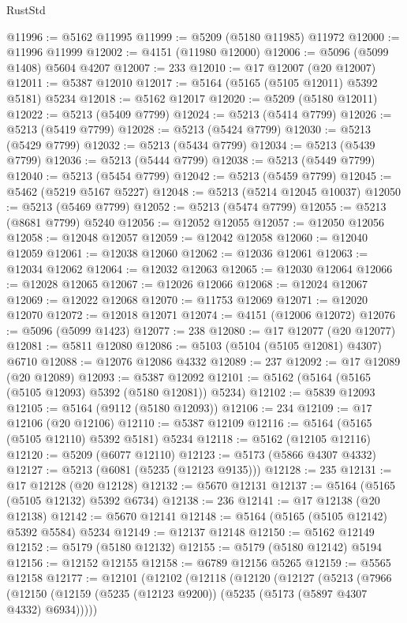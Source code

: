 \begin{lexlean}{RustStd}
\begin{coremodule}
@11996 := @5162 @11995
@11999 := @5209 (@5180 @11985) @11972
@12000 := @11996 @11999
@12002 := @4151 (@11980 @12000)
@12006 := @5096 (@5099 @1408) @5604 @4207
@12007 := 233
@12010 := @17 @12007 (@20 @12007)
@12011 := @5387 @12010
@12017 := @5164 (@5165 (@5105 @12011) @5392 @5181) @5234
@12018 := @5162 @12017
@12020 := @5209 (@5180 @12011)
@12022 := @5213 (@5409 @7799)
@12024 := @5213 (@5414 @7799)
@12026 := @5213 (@5419 @7799)
@12028 := @5213 (@5424 @7799)
@12030 := @5213 (@5429 @7799)
@12032 := @5213 (@5434 @7799)
@12034 := @5213 (@5439 @7799)
@12036 := @5213 (@5444 @7799)
@12038 := @5213 (@5449 @7799)
@12040 := @5213 (@5454 @7799)
@12042 := @5213 (@5459 @7799)
@12045 := @5462 (@5219 @5167 @5227)
@12048 := @5213 (@5214 @12045 @10037)
@12050 := @5213 (@5469 @7799)
@12052 := @5213 (@5474 @7799)
@12055 := @5213 (@8681 @7799) @5240
@12056 := @12052 @12055
@12057 := @12050 @12056
@12058 := @12048 @12057
@12059 := @12042 @12058
@12060 := @12040 @12059
@12061 := @12038 @12060
@12062 := @12036 @12061
@12063 := @12034 @12062
@12064 := @12032 @12063
@12065 := @12030 @12064
@12066 := @12028 @12065
@12067 := @12026 @12066
@12068 := @12024 @12067
@12069 := @12022 @12068
@12070 := @11753 @12069
@12071 := @12020 @12070
@12072 := @12018 @12071
@12074 := @4151 (@12006 @12072)
@12076 := @5096 (@5099 @1423)
@12077 := 238
@12080 := @17 @12077 (@20 @12077)
@12081 := @5811 @12080
@12086 := @5103 (@5104 (@5105 @12081) @4307) @6710
@12088 := @12076 @12086 @4332
@12089 := 237
@12092 := @17 @12089 (@20 @12089)
@12093 := @5387 @12092
@12101 := @5162 (@5164 (@5165 (@5105 @12093) @5392 (@5180 @12081)) @5234)
@12102 := @5839 @12093
@12105 := @5164 (@9112 (@5180 @12093))
@12106 := 234
@12109 := @17 @12106 (@20 @12106)
@12110 := @5387 @12109
@12116 := @5164 (@5165 (@5105 @12110) @5392 @5181) @5234
@12118 := @5162 (@12105 @12116)
@12120 := @5209 (@6077 @12110)
@12123 := @5173 (@5866 @4307 @4332)
@12127 := @5213 (@6081 (@5235 (@12123 @9135)))
@12128 := 235
@12131 := @17 @12128 (@20 @12128)
@12132 := @5670 @12131
@12137 := @5164 (@5165 (@5105 @12132) @5392 @6734)
@12138 := 236
@12141 := @17 @12138 (@20 @12138)
@12142 := @5670 @12141
@12148 := @5164 (@5165 (@5105 @12142) @5392 @5584) @5234
@12149 := @12137 @12148
@12150 := @5162 @12149
@12152 := @5179 (@5180 @12132)
@12155 := @5179 (@5180 @12142) @5194
@12156 := @12152 @12155
@12158 := @6789 @12156 @5265
@12159 := @5565 @12158
@12177 := @12101
    (@12102
      (@12118
        (@12120
          (@12127
            (@5213
              (@7966
                (@12150 (@12159 (@5235 (@12123 @9200)) (@5235 (@5173 (@5897 @4307 @4332) @6934)))))

\end{coremodule}
\end{lexlean}

